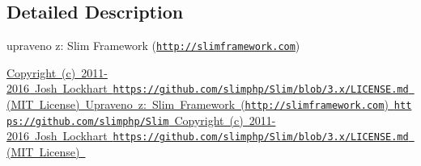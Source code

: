 \subsection{Detailed Description}
upraveno z\+: Slim Framework (\href{http://slimframework.com}{\tt http\+://slimframework.\+com})

\mbox{\hyperlink{}{Copyright (c) 2011-\/2016 Josh Lockhart  \href{https://github.com/slimphp/Slim/blob/3.x/LICENSE.md}{\tt https\+://github.\+com/slimphp/\+Slim/blob/3.\+x/\+L\+I\+C\+E\+N\+S\+E.\+md} (M\+IT License) Upraveno z\+: Slim Framework (\href{http://slimframework.com}{\tt http\+://slimframework.\+com})  \href{https://github.com/slimphp/Slim}{\tt https\+://github.\+com/slimphp/\+Slim}  Copyright (c) 2011-\/2016 Josh Lockhart  \href{https://github.com/slimphp/Slim/blob/3.x/LICENSE.md}{\tt https\+://github.\+com/slimphp/\+Slim/blob/3.\+x/\+L\+I\+C\+E\+N\+S\+E.\+md} (M\+IT License) }}